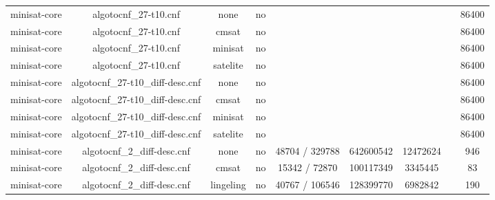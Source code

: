 \begin{appendices}
\begin{table}[p]
\begin{center}
\begin{tabular}{l|cccccccc}
  minisat-core                   & algotocnf\_27-t10.cnf          & none       & no    &            &           &           &            & 86400 \\ %
  minisat-core                   & algotocnf\_27-t10.cnf          & cmsat      & no    &            &           &           &            & 86400 \\ %
  minisat-core                   & algotocnf\_27-t10.cnf          & minisat    & no    &            &           &           &            & 86400 \\ %
  minisat-core                   & algotocnf\_27-t10.cnf          & satelite   & no    &            &           &           &            & 86400 \\ %
  minisat-core                   & algotocnf\_27-t10\_diff-desc.cnf & none       & no    &            &           &           &            & 86400 \\ %
  minisat-core                   & algotocnf\_27-t10\_diff-desc.cnf & cmsat      & no    &            &           &           &            & 86400 \\ %
  minisat-core                   & algotocnf\_27-t10\_diff-desc.cnf & minisat    & no    &            &           &           &            & 86400 \\ %
  minisat-core                   & algotocnf\_27-t10\_diff-desc.cnf & satelite   & no    &            &           &           &            & 86400 \\ %
  minisat-core                   & algotocnf\_2\_diff-desc.cnf    & none       & no    & 48704 / 329788 & 642600542 & 12472624  &            & 946 \\ %
  minisat-core                   & algotocnf\_2\_diff-desc.cnf    & cmsat      & no    & 15342 / 72870 & 100117349 & 3345445   &            & 83 \\ %
  minisat-core                   & algotocnf\_2\_diff-desc.cnf    & lingeling  & no    & 40767 / 106546 & 128399770 & 6982842   &            & 190 \\ %

\end{tabular}
\end{center}
\end{table}
\end{appendices}
